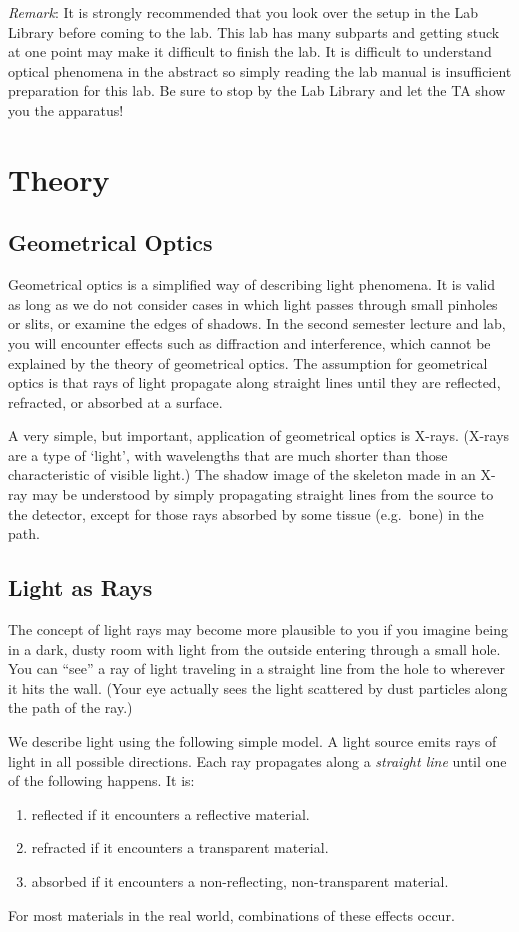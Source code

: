 \emph{Remark}: It is strongly recommended that you look over the setup in the Lab Library before coming to the lab. This lab has many subparts and getting stuck at one point may make it difficult to finish the lab.  It is difficult to understand optical phenomena in the abstract so simply reading the lab manual is insufficient preparation for this lab.  Be sure to stop by the Lab Library and let the TA show you the apparatus!

\section{Theory}

\subsection{Geometrical Optics}

Geometrical optics is a simplified way of describing light phenomena. It is valid as long as we do not consider cases in which light passes through small pinholes or slits, or examine the edges of shadows. In the second semester lecture and lab, you will encounter effects such as diffraction and interference, which cannot be explained by the theory of geometrical optics. The assumption for geometrical optics is that rays of light propagate along straight lines until they are reflected, refracted, or absorbed at a surface. \myskip

A very simple, but important, application of geometrical optics is X-rays. (X-rays are a type of `light', with wavelengths that are much shorter than those characteristic of visible light.)  The shadow image of the skeleton made in an X-ray may be understood by simply propagating straight lines from the source to the detector, except for those rays absorbed by some tissue (e.g.\ bone) in the path.

\subsection{Light as Rays}

The concept of light rays may become more plausible to you if you imagine being in a dark, dusty room with light from the outside entering through a small hole. You can ``see'' a ray of light traveling in a straight line from the hole to wherever it hits the wall.  (Your eye actually sees the light scattered by dust particles along the path of the ray.)\myskip

We describe light using the following simple model. A light source emits rays of light in all possible directions. Each ray propagates along a \emph{straight line} until one of the following happens. It is:  
\begin{enumerate}
    \item	reflected if it encounters a reflective material. 
    \item	refracted if it encounters a transparent material.  
    \item	absorbed if it encounters a non-reflecting, non-transparent material. 
\end{enumerate}
For most materials in the real world, combinations of these effects occur.\myskip

